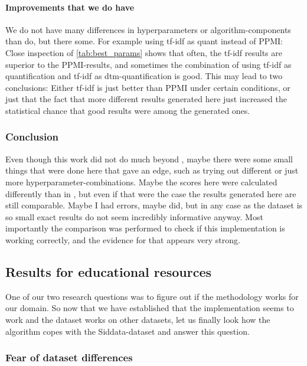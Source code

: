 \paragraph{Improvements that we do have}

We do not have many differences in hyperparameters or algorithm-components than \mainalgos do, but there some. For example using tf-idf as \gls{quant} instead of PPMI: Close inspection of \autoref{tab:best_params} shows that often, the tf-idf results are superior to the PPMI-results, and sometimes the combination of using tf-idf as quantification and tf-idf as dtm-quantification is good. This may lead to two conclusions: Either tf-idf is just better than PPMI under certain conditions, or just that the fact that more different results generated here just increased the statistical chance that good results were among the generated ones.

\subsubsection*{Conclusion} 

Even though this work did not do much beyond \mainalgos, maybe there were some small things that were done here that gave an edge, such as trying out different or just more hyperparameter-combinations. Maybe the scores here were calculated differently than in \mainalgos, but even if that were the case the results generated here are still comparable. Maybe I had errors, maybe \mainalgos did, but in any case as the dataset is so small exact results do not seem incredibly informative anyway. Most importantly the comparison was performed to check if this implementation is working correctly, and the evidence for that appears very strong.

\subsection{Results for educational resources}

One of our two research questions was to figure out if the methodology works for our domain. So now that we have established that the implementation seems to work and the dataset works on other datasets, let us finally look how the algorithm copes with the Siddata-dataset and answer this question.

\subsubsection{Fear of dataset differences}
\label{sec:discuss_datasetdiffs}

